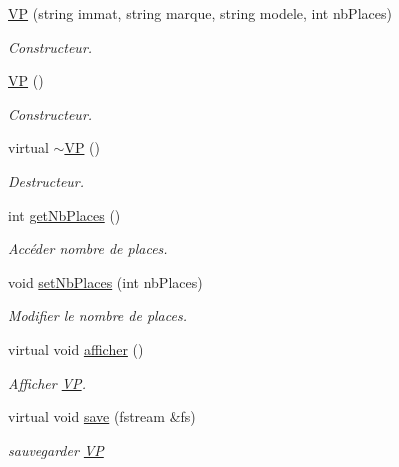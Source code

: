 \begin{DoxyCompactItemize}
\item 
\hyperlink{class_v_p_a4bde97e27db770144037907d2eb0d081}{VP} (string immat, string marque, string modele, int nbPlaces)
\begin{DoxyCompactList}\small\item\em Constructeur. \item\end{DoxyCompactList}\item 
\hyperlink{class_v_p_ad67a48c8f2f8d3cc8466431d4e0c2949}{VP} ()
\begin{DoxyCompactList}\small\item\em Constructeur. \item\end{DoxyCompactList}\item 
virtual \hyperlink{class_v_p_ae9afa0cd76ea91730282e2ae82d0e203}{$\sim$VP} ()
\begin{DoxyCompactList}\small\item\em Destructeur. \item\end{DoxyCompactList}\item 
int \hyperlink{class_v_p_a6e6a4443cb9f83e0d94e3459b70bd73d}{getNbPlaces} ()
\begin{DoxyCompactList}\small\item\em Accéder nombre de places. \item\end{DoxyCompactList}\item 
void \hyperlink{class_v_p_a678d522ed1085e94814660d93edd9e7c}{setNbPlaces} (int nbPlaces)
\begin{DoxyCompactList}\small\item\em Modifier le nombre de places. \item\end{DoxyCompactList}\item 
virtual void \hyperlink{class_v_p_a3af04349e81a3c643b497898ad19ef7a}{afficher} ()
\begin{DoxyCompactList}\small\item\em Afficher \hyperlink{class_v_p}{VP}. \item\end{DoxyCompactList}\item 
virtual void \hyperlink{class_v_p_a3fe677e58cb952b7784d5f661ef426e6}{save} (fstream \&fs)
\begin{DoxyCompactList}\small\item\em sauvegarder \hyperlink{class_v_p}{VP} \item\end{DoxyCompactList}\end{DoxyCompactItemize}


